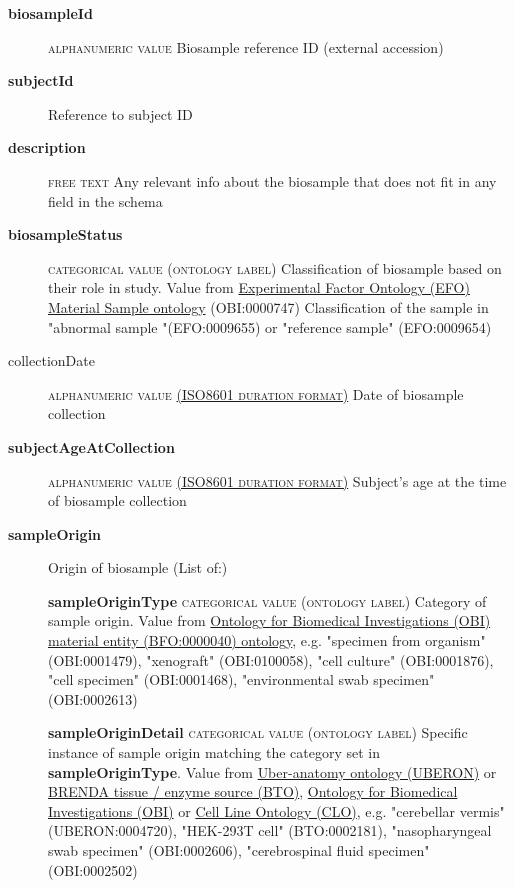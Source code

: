 \documentclass[a4paper, 10pt]{article}        %
\begin{document}
  \begin{description}
	\item[\textbf{biosampleId}]  {\textsc{alphanumeric value}} Biosample reference ID (external accession)
	\item[\textbf{subjectId}] Reference to subject ID
	\item[\textbf{description}]  {\textsc{free text}} Any relevant info about the biosample that does not fit in any field in the schema
	\item[\textbf{biosampleStatus}] {\textsc{categorical value (ontology label)}} Classification of biosample based on their role in study. Value from  \href{https://www.ebi.ac.uk/ols/ontologies/efo/terms?iri=http%3A%2F%2Fpurl.obolibrary.org%2Fobo%2FOBI_0000747&viewMode=All&siblings=false}{Experimental Factor Ontology (EFO) Material Sample ontology} (OBI:0000747) Classification of the sample in "abnormal sample "(EFO:0009655) or "reference sample" (EFO:0009654)
	\item[collectionDate] {\textsc{alphanumeric value \href{https://www.iso.org/iso-8601-date-and-time-format.html}{(ISO8601 duration format)}}} Date of biosample collection
	\item[\textbf{subjectAgeAtCollection}] {\textsc{alphanumeric value \href{https://www.iso.org/iso-8601-date-and-time-format.html}{(ISO8601 duration format)}}} Subject's age at  the time of biosample collection
	\item[\textbf{sampleOrigin}] Origin of biosample (List of:)
	\item[] \textbf{sampleOriginType} {\textsc{categorical value (ontology label)}} Category of sample origin. Value from \href{http://purl.obolibrary.org/obo/BFO_0000040}{Ontology for Biomedical Investigations (OBI) material entity (BFO:0000040) ontology}, e.g. "specimen from organism" (OBI:0001479), "xenograft" (OBI:0100058), "cell culture" (OBI:0001876), "cell specimen" (OBI:0001468), "environmental swab specimen" (OBI:0002613)
	\item[] \textbf{sampleOriginDetail} {\textsc{categorical value (ontology label)}} Specific instance of sample origin matching the category set in \textbf{sampleOriginType}. Value from \href{https://www.ebi.ac.uk/ols/ontologies/uberon}{Uber-anatomy ontology (UBERON)} or \href{https://www.ebi.ac.uk/ols/ontologies/bto}{BRENDA tissue / enzyme source (BTO)}, \href{http://purl.obolibrary.org/obo/BFO_0000040}{Ontology for Biomedical Investigations (OBI)} or \href{www.ebi.ac.uk/ols/ontologies/clo}{Cell Line Ontology (CLO)}, e.g. "cerebellar vermis" (UBERON:0004720), "HEK-293T cell" (BTO:0002181), "nasopharyngeal swab specimen" (OBI:0002606), "cerebrospinal fluid specimen" (OBI:0002502)

\end{description}
\end{document}
